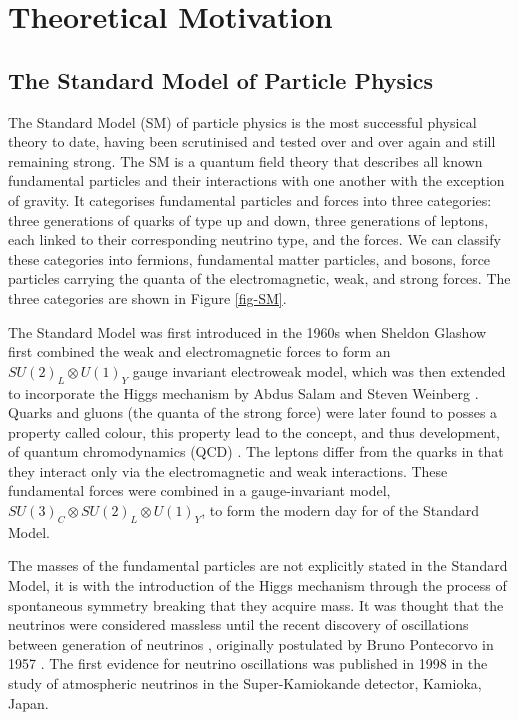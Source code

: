 \chapter{Theoretical Motivation} \label{chap-theory}


\section{The Standard Model of Particle Physics} \label{sec-StandardModel}

The Standard Model (SM) of particle physics is the most successful physical theory to date, having been scrutinised and tested over and over again and still remaining strong. The SM is a quantum field theory that describes all known fundamental particles and their interactions with one another with the exception of gravity. It categorises fundamental particles and forces into three categories: three generations of quarks of type up and down, three generations of leptons, each linked to their corresponding neutrino type, and the forces. We can classify these categories into fermions, fundamental matter particles, and bosons, force particles carrying the quanta of the electromagnetic, weak, and strong forces. The three categories are shown in Figure \ref{fig-SM}. 

The Standard Model was first introduced in the 1960s when Sheldon Glashow first combined the weak and electromagnetic forces \cite{Glashow:1961tr} to form an $SU(2)_L \otimes U(1)_Y$ gauge invariant electroweak model, which was then extended to incorporate the Higgs mechanism by Abdus Salam and Steven Weinberg \cite{PhysRevLett.19.1264, Salam:1959zz}. Quarks and gluons (the quanta of the strong force) were later found to posses a property called colour, this property lead to the concept, and thus development, of quantum chromodynamics (QCD) \cite{GellMann:1964nj,PhysRevD.8.3633, PhysRevLett.30.1346}. The leptons differ from the quarks in that they interact only via the electromagnetic and weak interactions. These fundamental forces were combined in a gauge-invariant model, $SU(3)_C \otimes SU(2)_L \otimes U(1)_Y$, to form the modern day for of the Standard Model. 

The masses of the fundamental particles are not explicitly stated in the Standard Model, it is with the introduction of the Higgs mechanism through the process of spontaneous symmetry breaking that they acquire mass. It was thought that the neutrinos were considered massless until the recent discovery of oscillations between generation of neutrinos \cite{PhysRevLett.81.1562}, originally postulated by Bruno Pontecorvo in 1957 \cite{Pontecorvo:1967fh}. The first evidence for neutrino oscillations was published in 1998 in the study of atmospheric neutrinos in the Super-Kamiokande detector, Kamioka, Japan.


